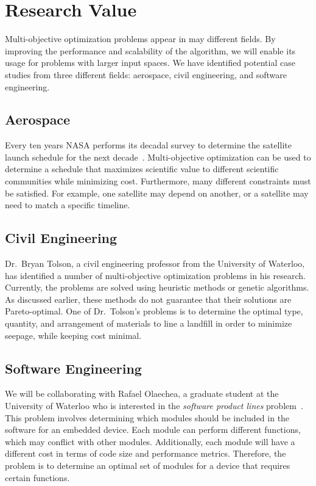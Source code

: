 \documentclass[11pt]{article}
\begin{document}
\section{Research Value}
Multi-objective optimization problems appear in may different fields.
By improving the performance and scalability of the algorithm, we will
enable its usage for problems with larger input spaces. We have
identified potential case studies from three different fields:
aerospace, civil engineering, and software engineering.

\subsection{Aerospace}
Every ten years NASA performs its decadal survey to determine the
satellite launch schedule for the next decade~\cite{ref:nasa11}.
Multi-objective optimization can be used to determine a schedule that
maximizes scientific value to different scientific communities while
minimizing cost. Furthermore, many different constraints must be
satisfied. For example, one satellite may depend on another, or a
satellite may need to match a specific timeline.

\subsection{Civil Engineering}
Dr.\ Bryan Tolson, a civil engineering professor from the University of
Waterloo, has identified a number of multi-objective optimization
problems in his research. Currently, the problems are solved using
heuristic methods or genetic algorithms. As discussed earlier, these
methods do not guarantee that their solutions are Pareto-optimal. One
of Dr.\ Tolson's problems is to determine the optimal type, quantity,
and arrangement of materials to line a landfill in order to minimize
seepage, while keeping cost minimal.

\subsection{Software Engineering}
We will be collaborating with Rafael Olaechea, a graduate student at
the University of Waterloo who is interested in the \textit{software
product lines} problem~\cite{ref:Olaechea12}. This problem involves
determining which modules should be included in the software for an
embedded device. Each module can perform different functions, which may
conflict with other modules. Additionally, each module will have a
different cost in terms of code size and performance metrics.
Therefore, the problem is to determine an optimal set of modules for a
device that requires certain functions.
\end{document}

